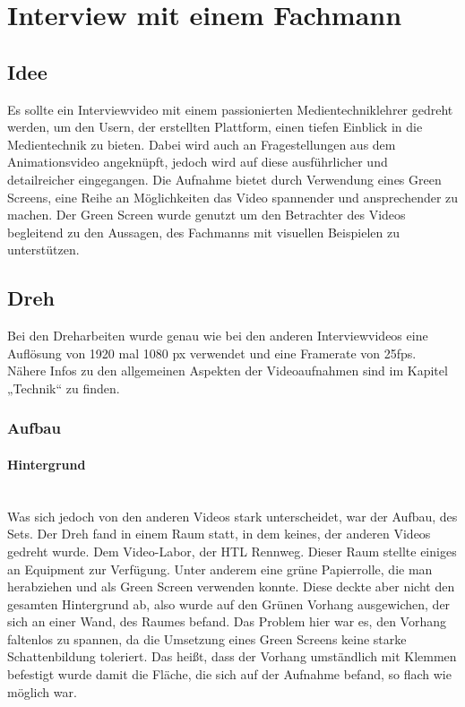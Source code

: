 \section{Interview mit einem Fachmann}
\subsection{Idee}
Es sollte ein Interviewvideo mit einem passionierten Medientechniklehrer gedreht werden, um den Usern, der erstellten Plattform, einen tiefen Einblick in die Medientechnik zu bieten. Dabei wird auch an Fragestellungen aus dem Animationsvideo angeknüpft, jedoch wird auf diese ausführlicher und detailreicher eingegangen. Die Aufnahme bietet durch Verwendung eines Green Screens, eine Reihe an Möglichkeiten das Video spannender und ansprechender zu machen. Der Green Screen wurde genutzt um den Betrachter des Videos begleitend zu den Aussagen, des Fachmanns mit visuellen Beispielen zu unterstützen.
\subsection{Dreh}
\renewcommand{\kapitelautor}{Autor: Niklas Kienreich}
Bei den Dreharbeiten wurde genau wie bei den anderen Interviewvideos eine Auflösung von 1920 mal 1080 px verwendet und eine Framerate von 25fps. Nähere Infos zu den allgemeinen Aspekten der Videoaufnahmen sind im Kapitel „Technik“ zu finden.
\subsubsection{Aufbau}
\paragraph{Hintergrund}
\leavevmode \\
Was sich jedoch von den anderen Videos stark unterscheidet, war der Aufbau, des Sets. Der Dreh fand in einem Raum statt, in dem keines, der anderen Videos gedreht wurde. Dem Video-Labor, der HTL Rennweg. Dieser Raum stellte einiges an Equipment zur Verfügung. Unter anderem eine grüne Papierrolle, die man herabziehen und als Green Screen verwenden konnte. Diese deckte aber nicht den gesamten Hintergrund ab, also wurde auf den Grünen Vorhang ausgewichen, der sich an einer Wand, des Raumes befand. Das Problem hier war es, den Vorhang faltenlos zu spannen, da die Umsetzung eines Green Screens keine starke Schattenbildung toleriert. Das heißt, dass der Vorhang umständlich mit Klemmen befestigt wurde damit die Fläche, die sich auf der Aufnahme befand, so flach wie möglich war.

